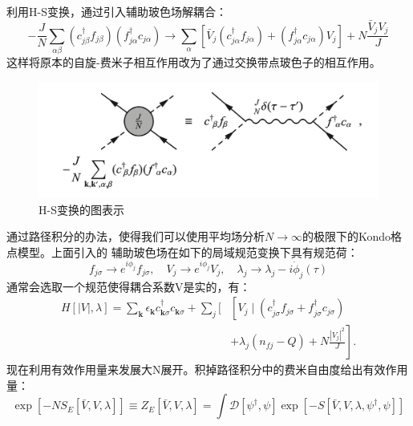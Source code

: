 \documentclass[10pt,openany]{book}
\theoremstyle{thmstyle} %
\theoremstyle{defstyle} %
\theoremstyle{prostyle} %
\begin{document}
利用H-S变换，通过引入辅助玻色场解耦合：
\begin{equation}
	-\frac{J}{N} \sum_{\alpha \beta}\left(c_{j \beta}^{\dagger} f_{j \beta}\right)\left(f_{j \alpha}^{\dagger} c_{j \alpha}\right) \rightarrow \sum_\alpha\left[\bar{V}_j\left(c_{j \alpha}^{\dagger} f_{j \alpha}\right)+\left(f_{j \alpha}^{\dagger} c_{j \alpha}\right) V_j\right]+N \frac{\bar{V}_j V_j}{J}
\end{equation}
这样将原本的自旋-费米子相互作用改为了通过交换带点玻色子的相互作用。
\begin{figure}[htbp]
	\centering
	\includegraphics*[scale=0.7]{Figures/H-ST.png}
	\caption{H-S变换的图表示}
\end{figure}
通过路径积分的办法，使得我们可以使用平均场分析$ N\to\infty $的极限下的Kondo格点模型。上面引入的
辅助玻色场在如下的局域规范变换下具有规范荷：
\begin{equation}
	f_{j \sigma} \rightarrow e^{i \phi_j} f_{j \sigma}, \quad V_j \rightarrow e^{i \phi_j} V_j, \quad \lambda_j \rightarrow \lambda_j-i \dot{\phi}_j(\tau)
\end{equation} 
通常会选取一个规范使得耦合系数V是实的，有：
\begin{equation}
	\begin{aligned}
		H[|V|, \lambda]=\sum_{\mathbf{k}} \epsilon_{\mathbf{k}} c_{\mathbf{k} \sigma}^{\dagger} c_{\mathbf{k} \sigma}+\sum_j[ & {\left[V_j \mid\left(c_{j \sigma}^{\dagger} f_{j \sigma}+f_{j \sigma}^{\dagger} c_{j \sigma}\right)\right.} \\
		& \left.+\lambda_j\left(n_{f j}-Q\right)+N \frac{\left|V_j\right|^2}{J}\right] .
		\end{aligned}
\end{equation}
现在利用有效作用量来发展大N展开。积掉路径积分中的费米自由度给出有效作用量：
\begin{equation}
	\exp \left[-N S_E[\bar{V}, V, \lambda]\right] \equiv Z_E[\bar{V}, V, \lambda]=\int \mathcal{D}\left[\psi^{\dagger}, \psi\right] \exp \left[-S\left[\bar{V}, V, \lambda, \psi^{\dagger}, \psi\right]\right]
\end{equation}
\end{document}
